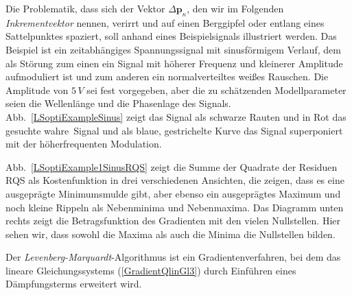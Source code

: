 Die Problematik, dass sich der Vektor $\Delta \mathbf{p}_{\kappa}$, den wir im
Folgenden \textsl{Inkrementvektor} nennen, verirrt und auf
einen Berggipfel oder entlang eines Sattelpunktes spaziert, soll anhand eines Beispielsignals
illustriert werden. Das Beispiel ist ein zeitabhängiges Spannungssignal mit sinusförmigem Verlauf,
dem als Störung zum einen ein Signal mit höherer Frequenz und kleinerer Amplitude aufmoduliert ist
und zum anderen ein normalverteiltes weißes Rauschen.
Die Amplitude von $5 \, V$ sei fest vorgegeben, aber die zu schätzenden Modellparameter seien
die Wellenlänge und die Phasenlage des Signals. Abb.~\ref{LSoptiExampleSinus} zeigt das Signal als
schwarze Rauten und in Rot das gesuchte \glqq wahre\grqq ~Signal und als blaue, gestrichelte Kurve
das Signal superponiert mit der höherfrequenten Modulation.

Abb.~\ref{LSoptiExample1SinusRQS} zeigt die Summe der Quadrate der Residuen RQS als
Kostenfunktion in drei verschiedenen Ansichten, die zeigen, dass es eine ausgeprägte Minimumsmulde gibt,
aber ebenso ein ausgeprägtes Maximum und noch kleine Rippeln als Nebenminima und Nebenmaxima.
Das Diagramm unten rechts zeigt die Betragsfunktion des Gradienten mit den vielen Nullstellen.
Hier sehen wir, dass sowohl die Maxima als auch die Minima die Nullstellen bilden.

Der \textsl{Levenberg-Marquardt}-Algorithmus ist ein Gradientenverfahren, bei dem das lineare
Gleichungssystems (\ref{GradientQlinGl3}) 
durch Einführen eines Dämpfungsterms erweitert wird. 

